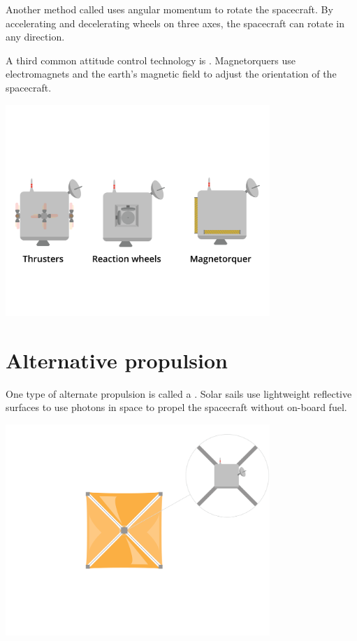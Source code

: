 	Another method called  uses angular momentum to rotate the spacecraft. By accelerating and decelerating wheels on three axes, the spacecraft can rotate in any direction.

	A third common attitude control technology is . Magnetorquers use electromagnets and the earth's magnetic field to adjust the orientation of the spacecraft. 


\includegraphics[width=0.75\textwidth]{controlSpace.png}



\section{Alternative propulsion}


One type of alternate propulsion is called a . Solar sails use lightweight reflective surfaces to use photons in space to propel the spacecraft without on-board fuel.


\includegraphics[width=0.75\textwidth]{solarSail.png}

